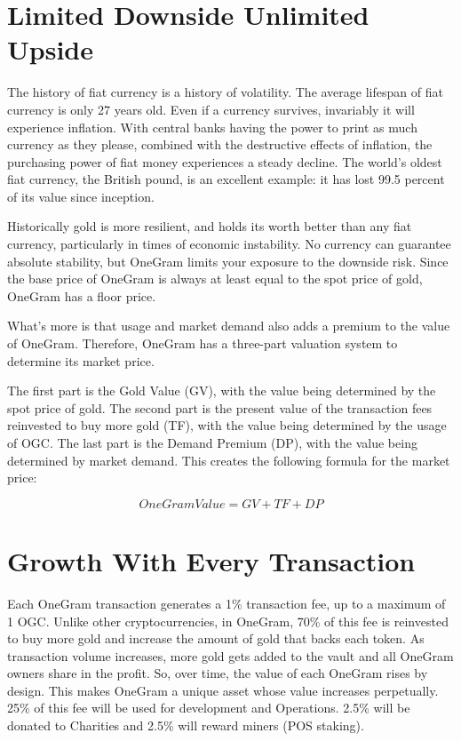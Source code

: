 \documentclass[letterpaper,11pt]{article}
\begin{document}
\section{Limited Downside Unlimited Upside
}

The history of fiat currency is a history of volatility. The average lifespan of fiat currency is only 27 years old\cite{pento}. Even if a currency survives, invariably it will experience inflation. With central banks having the power to print as much currency as they please, combined with the destructive effects of inflation, the purchasing power of fiat money experiences a steady decline. The world’s oldest fiat currency, the British pound, is an excellent example: it has lost 99.5 percent of its value since inception.

Historically gold is more resilient, and holds its worth better than any fiat currency, particularly in times of economic instability. No currency can guarantee absolute stability, but OneGram limits your exposure to the downside risk. Since the base price of OneGram is always at least equal to the spot price of gold, OneGram has a floor price.

What’s more is that usage and market demand also adds a premium to the value of OneGram. Therefore, OneGram has a three-part valuation system to determine its market price.

The first part is the Gold Value (GV), with the value being determined by the spot price of gold. The second part is the present value of the transaction fees reinvested to buy more gold (TF), with the value being determined by the usage of OGC. The last part is the Demand Premium (DP), with the value being determined by market demand. This creates the following formula for the market price: 

\[ OneGram Value = GV + TF + DP  \]


\section{Growth With Every Transaction}

Each OneGram transaction generates a 1\% transaction fee, up to a maximum of 1 OGC. Unlike other cryptocurrencies, in OneGram, 70\% of this fee is reinvested to buy more gold and increase the amount of gold that backs each token. As transaction volume increases, more gold gets added to the vault and all OneGram owners share in the profit. So, over time, the value of each OneGram rises by design. This makes OneGram a unique asset whose value increases perpetually. 25\% of this fee will be used for development and Operations. 2.5\% will be donated to Charities and 2.5\% will reward miners (POS staking).
\end{document}
